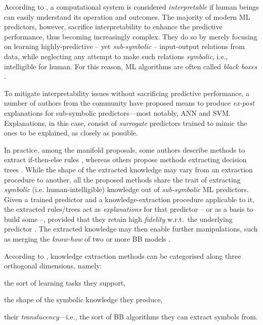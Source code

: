 \documentclass[12pt,a4paper,openright,twoside]{book}
\begin{document}
According to \cite{agentbasedxai-aamas2020}, a computational system is considered \emph{interpretable} if human beings can easily understand its operation and outcomes.
%
The majority of modern ML predictors, however, sacrifice interpretability to enhance the predictive performance, thus becoming increasingly complex.
%
They do so by merely focusing on learning highly-predictive -- yet \emph{sub-symbolic} -- input-output relations from data, while neglecting any attempt to make such relations \emph{symbolic}, i.e., intelligible for human.
%
For this reason, ML algorithms are often called \emph{black boxes} \cite{Lipton18}.

To mitigate interpretability issues without sacrificing predictive performance, a number of authors from the \xai{} community have proposed means to produce \emph{ex-post} explanations for sub-symbolic predictors---most notably, ANN and SVM.
%
Explanations, in this case, consist of \emph{surrogate} predictors trained to mimic the ones to be explained, as closely as possible.

In practice, among the manifold proposals, some authors describe methods to extract if-then-else rules \cite{CravenS94,HuysmansBV2006,gridex-extraamas2021}, whereas others propose methods extracting decision trees \cite{Craven1996}.
%
While the shape of the extracted knowledge may vary from an extraction procedure to another, all the proposed methods share the trait of extracting \emph{symbolic} (i.e. human-intelligible) knowledge out of \emph{sub-symbolic} ML predictors.
%
Given a trained predictor and a knowledge-extraction procedure applicable to it, the extracted rules/trees act as \emph{explanations} for that predictor -- or as a basis to build some --, provided that they retain high \emph{fidelity} w.r.t.\ the underlying predictor \cite{agentbasedxai-aamas2020}.
%
The extracted knowledge may then enable further manipulations, such as merging the \emph{know-how} of two or more BB models \cite{xmas-aiiot2019}.

According to \cite{xaisurvey-ia14}, knowledge extraction methods can be categorised along three orthogonal dimensions, namely:
%
\begin{inlinelist}
    \item\label{item:category:learning-task} the sort of learning tasks they support,
    \item\label{item:category:knowledge-form} the shape of the symbolic knowledge they produce,
    \item\label{item:category:translucency} their \emph{translucency}---i.e., the sort of BB algorithms they can extract symbols from.
\end{inlinelist}
\end{document}
